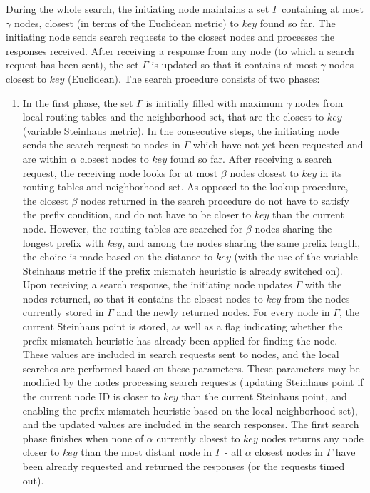 \smallskip
\noindent
During the whole search, the initiating node maintains a set $\Gamma$ containing at most $\gamma$ nodes, closest (in terms of the Euclidean metric) to $key$ found so far. The initiating node sends search requests to the closest nodes and processes the responses received. After receiving a response from any node (to which a search request has been sent), the set $\Gamma$ is updated so that it contains at most $\gamma$ nodes closest to $key$ (Euclidean). The search procedure consists of two phases:

\begin{enumerate}

\item In the first phase, the set $\Gamma$ is initially filled with maximum $\gamma$ nodes from local routing tables and the neighborhood set, that are the closest to $key$ (variable Steinhaus metric). In the consecutive steps, the initiating node sends the search request to nodes in $\Gamma$ which have not yet been requested and are within $\alpha$ closest nodes to $key$ found so far. After receiving a search request, the receiving node looks for at most $\beta$ nodes closest to $key$ in its routing tables and neighborhood set. As opposed to the lookup procedure, the closest $\beta$ nodes returned in the search procedure do not have to satisfy the prefix condition, and do not have to be closer to $key$ than the current node. However, the routing tables are searched for $\beta$ nodes sharing the longest prefix with $key$, and among the nodes sharing the same prefix length, the choice is made based on the distance to $key$ (with the use of the variable Steinhaus metric if the prefix mismatch heuristic is already switched on). Upon receiving a search response, the initiating node updates $\Gamma$ with the nodes returned, so that it contains the closest nodes to $key$ from the nodes currently stored in $\Gamma$ and the newly returned nodes.
For every node in $\Gamma$, the current Steinhaus point is stored, as well as a flag indicating whether the prefix mismatch heuristic has already been applied for finding the node. These values are included in search requests sent to nodes, and the local searches are performed based on these parameters. These parameters may be modified by the nodes processing search requests (updating Steinhaus point if the current node ID is closer to $key$ than the current Steinhaus point, and enabling the prefix mismatch heuristic based on the local neighborhood set), and the updated values are included in the search responses. The first search phase finishes when none of $\alpha$ currently closest to $key$ nodes returns any node closer to $key$ than the most distant node in $\Gamma$ - all $\alpha$ closest nodes in $\Gamma$ have been already requested and returned the responses (or the requests timed out).


\end{enumerate}
